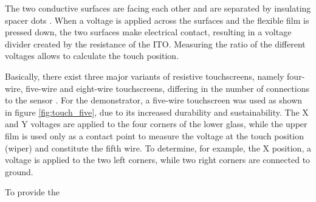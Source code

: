 The two conductive surfaces are facing each other and
are separated by insulating spacer dots \citep{Wal12}. When a voltage is
applied across the surfaces and the flexible film is pressed down, the two
surfaces make electrical contact, resulting in a voltage divider created by
the resistance of the \ac{ITO}. Measuring the ratio of the different voltages
allows to calculate the touch position.

Basically, there exist three major variants of resistive touchscreens, namely
four-wire, five-wire and eight-wire touchscreens, differing in the number of
connections to the sensor \citep{Wal12}. For the demonstrator, a five-wire
touchscreen was used as shown in figure \ref{fig:touch_five}, due to its
increased durability and sustainability. The X and Y voltages are applied to
the four corners of the lower glass, while the upper film is used only as a
contact point to measure the voltage at the touch position (wiper) and
constitute the fifth wire. To determine, for example, the X position, a
voltage is applied to the two left corners, while two right corners are
connected to ground.

To provide the 

